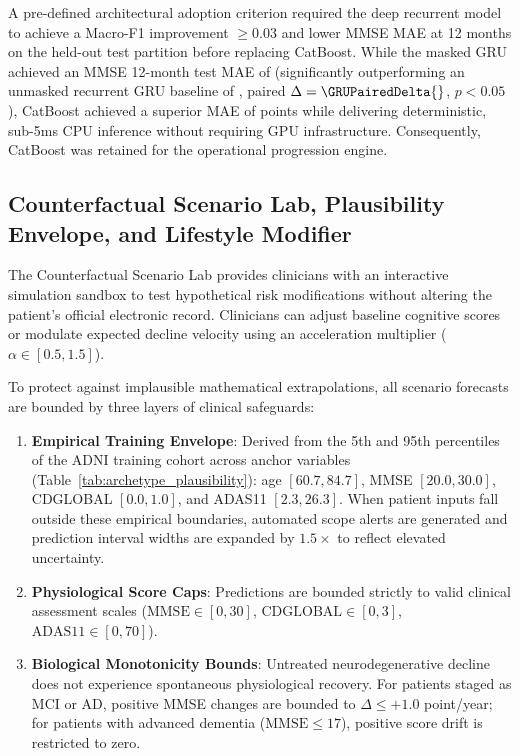 A pre-defined architectural adoption criterion required the deep recurrent model to achieve a Macro-F1 improvement $\ge 0.03$ and lower MMSE MAE at 12 months on the held-out test partition before replacing CatBoost. While the masked GRU achieved an MMSE 12-month test MAE of \GRUMaskedMAE{} (significantly outperforming an unmasked recurrent GRU baseline of \GRUUnmaskedMAE{}, paired $\Delta = \GRUPairedDelta{}$, $p < 0.05$), CatBoost achieved a superior MAE of \GBMProgressionMAE{} points while delivering deterministic, sub-5ms CPU inference without requiring GPU infrastructure. Consequently, CatBoost was retained for the operational progression engine.

\subsection{Counterfactual Scenario Lab, Plausibility Envelope, and Lifestyle Modifier}
The Counterfactual Scenario Lab provides clinicians with an interactive simulation sandbox to test hypothetical risk modifications without altering the patient's official electronic record. Clinicians can adjust baseline cognitive scores or modulate expected decline velocity using an acceleration multiplier ($\alpha \in [0.5, 1.5]$).

To protect against implausible mathematical extrapolations, all scenario forecasts are bounded by three layers of clinical safeguards:
\begin{enumerate}
    \item \textbf{Empirical Training Envelope}: Derived from the 5th and 95th percentiles of the ADNI training cohort across anchor variables (Table~\ref{tab:archetype_plausibility}): age $[60.7, 84.7]$, MMSE $[20.0, 30.0]$, CDGLOBAL $[0.0, 1.0]$, and ADAS11 $[2.3, 26.3]$. When patient inputs fall outside these empirical boundaries, automated scope alerts are generated and prediction interval widths are expanded by $1.5\times$ to reflect elevated uncertainty.
    \item \textbf{Physiological Score Caps}: Predictions are bounded strictly to valid clinical assessment scales ($\text{MMSE} \in [0, 30]$, $\text{CDGLOBAL} \in [0, 3]$, $\text{ADAS11} \in [0, 70]$).
    \item \textbf{Biological Monotonicity Bounds}: Untreated neurodegenerative decline does not experience spontaneous physiological recovery. For patients staged as MCI or AD, positive MMSE changes are bounded to $\Delta \le +1.0$ point/year; for patients with advanced dementia ($\text{MMSE} \le 17$), positive score drift is restricted to zero.
\end{enumerate}

